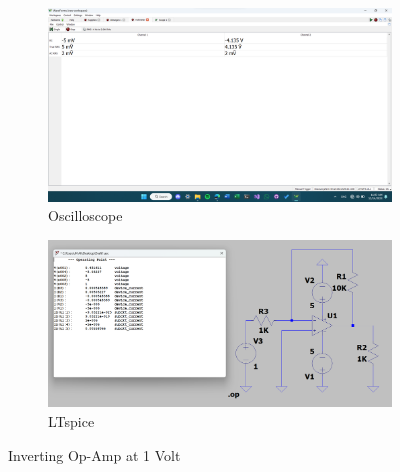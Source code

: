 \documentclass{zc-ust-hw}
\begin{document}
\begin{figure}[htpb]
  \centering
  \begin{subfigure}[b]{0.45\textwidth}
    \includegraphics[width=\textwidth]{figures/inv-opamp-1v.png}
    \caption{Oscilloscope}
  \end{subfigure}
  \hfill
  \begin{subfigure}[b]{0.45\textwidth}
    \includegraphics[width=\textwidth]{figures/inv-opamp-1v-lts.png}
    \caption{LTspice}
  \end{subfigure}
  \caption{Inverting Op-Amp at 1 Volt}
\end{figure}
\end{document}
